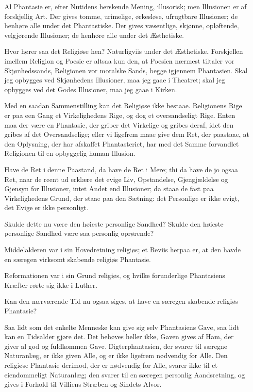 \documentclass[12pt,a4paper]{book}
\newcommand{\apage}[1]{\marginnote{\footnotesize\textit{[#1]}}}
\begin{document}
Al Phantasie er, efter Nutidens herskende Mening, illusorisk; men Illusionen er af forskjellig Art. Der gives tomme, urimelige, ørkesløse, ufrugtbare Illusioner; de henhøre alle under det Phantastiske. Der gives væsentlige, skjønne, opløftende, velgjørende Illusioner; de henhøre alle under det Æsthetiske.

Hvor hører saa det Religiøse hen? Naturligviis under det Æsthetiske. Forskjellen imellem Religion og Poesie er altsaa kun den, at Poesien nærmest tiltaler vor Skjønhedssands, Religionen vor moralske Sands, begge igjennem Phantasien. Skal jeg opbygges ved Skjønhedens Illusioner, maa jeg gaae i Theatret; skal jeg opbygges ved det Godes Illusioner, maa jeg gaae i Kirken.

Med en saadan Sammenstilling kan det Religiøse ikke bestaae. Religionens Rige er paa een Gang et Virkelighedens Rige, og dog et oversandseligt Rige. Enten maa der være en Phantasie, der griber det Virkelige og gribes deraf, idet den gribes af det Oversandselige; eller vi ligefrem maae give dem Ret, der paastaae, at den Oplysning, der har afskaffet Phantasteriet, har med det Samme forvandlet Religionen til en opbyggelig human Illusion.

Have de Ret i denne Paastand, da have de Ret i Mere; thi da have de jo ogsaa Ret, naar de reent ud erklære det evige Liv, Opstandelse, Gjengjældelse og Gjensyn for Illusioner, intet Andet end Illusioner; da staae de fast paa Virkelighedens Grund, der staae paa den Sætning: det Personlige er ikke evigt, det Evige er ikke personligt.

Skulde dette nu være den høieste personlige Sandhed? Skulde den høieste personlige Sandhed være saa personlig oprørende?

Middelalderen var i sin Hovedretning religiøs; et Beviis herpaa er, at den havde en særegen virksomt skabende religiøs Phantasie.
 \apage{11}

Reformationen var i sin Grund religiøs, og hvilke forunderlige Phantasiens Kræfter rørte sig ikke i Luther.

Kan den nærværende Tid nu ogsaa siges, at have en særegen skabende religiøs Phantasie?

Saa lidt som det enkelte Menneske kan give sig selv Phantasiens Gave, saa lidt kan en Tidsalder gjøre det. Det behøves heller ikke, Gaven gives af Ham, der giver al god og fuldkommen Gave. Digterphantasien, der svarer til særegne Naturanlæg, er ikke given Alle, og er ikke ligefrem nødvendig for Alle. Den religiøse Phantasie derimod, der er nødvendig for Alle, svarer ikke til et eiendommeligt Naturanlæg; den svarer til en særegen personlig Aandsretning, og gives i Forhold til Villiens Stræben og Sindets Alvor.
\end{document}
